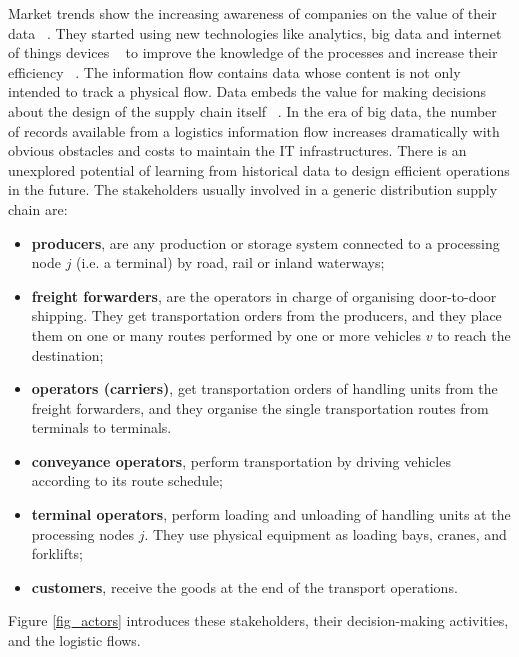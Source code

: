 Market trends show the increasing awareness of companies on the value of their data ~\cite{Lamba2017}. They started using new technologies like analytics, big data and internet of things devices ~\cite{Govindan2018} to improve the knowledge of the processes and increase their efficiency ~\cite{Ku2018}. The information flow contains data whose content is not only intended to track a physical flow. Data embeds the value for making decisions about the design of the supply chain itself ~\cite{Zuidwijk2014}. In the era of big data, the number of records available from a logistics information flow increases dramatically with obvious obstacles and costs to maintain the IT infrastructures. There is an unexplored potential of learning from historical data to design efficient operations in the future. The stakeholders usually involved in a generic distribution supply chain are:\par

\begin{itemize}
    \item \textbf{producers}, are any production or storage system connected to a processing node $j$ (i.e. a terminal) by road, rail or inland waterways;
	\item \textbf{freight forwarders}, are the operators in charge of organising door-to-door shipping. They get transportation orders from the producers, and they place them on one or many routes performed by one or more vehicles $v$ to reach the destination;
	\item \textbf{operators (carriers)},  get transportation orders of handling units from the freight forwarders, and they organise the single transportation routes from terminals to terminals.
	\item \textbf{conveyance operators}, perform transportation by driving vehicles according to its route schedule;
	\item \textbf{terminal operators}, perform loading and unloading of handling units at the processing nodes $j$. They use physical equipment as loading bays, cranes, and forklifts;
	\item \textbf{customers}, receive the goods at the end of the transport operations.

\end{itemize}

Figure \ref{fig_actors} introduces these stakeholders, their decision-making activities, and the logistic flows.

